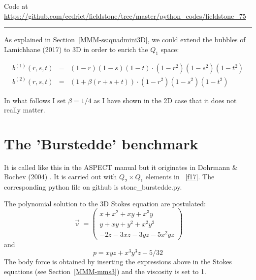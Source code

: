 

\begin{center}
Code at \url{https://github.com/cedrict/fieldstone/tree/master/python_codes/fieldstone_75}
\end{center}

\par\noindent\rule{\textwidth}{0.4pt}


As explained in Section~\ref{MMM-ss:quadmini3D}, we could extend the bubbles 
of Lamichhane (2017) \cite{lami17} to 3D in order to enrich the $Q_1$ space:

\begin{eqnarray}
b^{(1)} (r,s,t) &=& (1-r)(1-s)(1-t) \cdot (1-r^2) (1-s^2) (1-t^2) \\
b^{(2)} (r,s,t) &=& (1 + \beta(r+s+t)) \cdot (1-r^2) (1-s^2) (1-t^2) 
\end{eqnarray}

In what follows I set $\beta=1/4$ as I have shown in the 2D case that it does not really matter. 

\section*{The 'Burstedde' benchmark} It is called like this in the ASPECT manual 
but it originates in Dohrmann \& Bochev (2004) \cite{dobo04}. It is carried 
out with $Q_2 \times Q_1$ elements in \stone~\ref{f17}. 
The corresponding python file on github is {\pythonfile stone\_burstedde.py}.

The polynomial solution to the 3D Stokes equation are postulated:
\begin{equation}
\vec{\upnu}
=
\left(
\begin{array}{c}
x+x^2+xy+x^3y \\
y + xy + y^2 + x^2 y^2\\
-2z - 3xz - 3yz - 5x^2 yz
\end{array}
\right)
\end{equation}
and
\begin{equation}
p = xyz + x^3 y^3z - 5/32
\end{equation}
The body force is obtained by inserting the expressions above in the Stokes equations
(see Section~\ref{MMM-mms3}) and the viscosity is set to 1.


